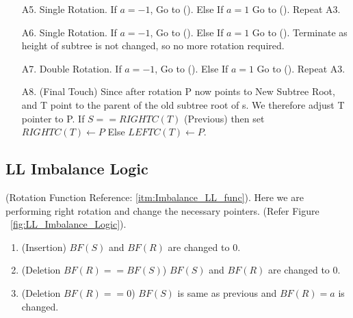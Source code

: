 \documentclass{article}
\begin{document}
\begin{itemize}
    \item[A5.] Single Rotation.  If $a = -1$, Go to (). Else If $a = 1$ Go to (). Repeat A3.
    \item[A6.] Single Rotation.  If $a = -1$, Go to (). Else If $a = 1$ Go to (). Terminate as height of subtree is not changed, so no more rotation required.
    \item[A7.] Double Rotation.  If $a = -1$, Go to (). Else If $a = 1$ Go to (). Repeat A3.
    \item[A8.] (Final Touch) Since after rotation P now points to New Subtree Root, and T point to the parent of the old subtree root of s.
    We therefore adjust T pointer to P.
     If $S == RIGHTC(T)$ (Previous) then set $RIGHTC(T) \leftarrow P$ Else $LEFTC(T) \leftarrow P$.
\end{itemize}

\subsection{LL Imbalance Logic}
\label{LL_Imb_op_logic}
(Rotation Function Reference: \ref{itm:Imbalance_LL_func}). \newline
Here we are performing right rotation and change the necessary pointers.
(Refer Figure  ~\ref{fig:LL_Imbalance_Logic}).
\begin{enumerate}
    \item (Insertion) $BF(S)$ and $BF(R)$ are changed to $0$.
    \item (Deletion $BF(R) == BF(S)$) $BF(S)$ and $BF(R)$ are changed to $0$.
    \item (Deletion $BF(R) == 0$) $BF(S)$ is same as previous and $BF(R) = a$ is changed.
\end{enumerate}
\end{document}

